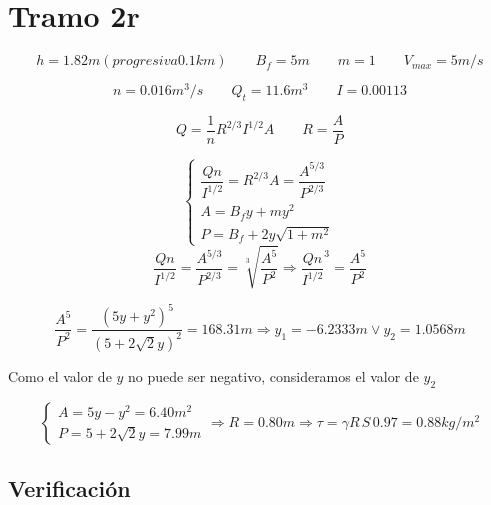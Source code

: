 \section*{Tramo 2r}


\begin{equation*}
  h = 1.82 m (progresiva 0.1 km)
 \qquad
  B_{f} = 5 m
 \qquad
  m = 1
 \qquad
  V_{max} = 5 m/s
\end{equation*}

\begin{equation*}
  n = 0.016 m^3/s
 \qquad
  Q_{t} = 11.6 m^{3}
 \qquad
  I = 0.00113
\end{equation*}

\begin{equation*}
 Q = \frac{1}{n} R^{2/3} I^{1/2} A
 \qquad
 R = \frac{A}{P}
\end{equation*}

\begin{equation*}
  \begin{cases}
    \dfrac{Q n}{I^{1/2}} = R^{2/3} A = \dfrac{A^{5/3}}{P^{2/3}} \\
    A = B_{f}y + m y^{2} \\
    P = B_{f} + 2 y \sqrt{1 + m^{2}}
  \end{cases}
\end{equation*}
\begin{equation*}
  \dfrac{Q n}{I^{1/2}} = \dfrac{A^{5/3}}{P^{2/3}} = \sqrt[3]{\dfrac{A^{5}}{P^{2}}}
  \Longrightarrow
  \dfrac{Q n}{I^{1/2}}^{3} = \dfrac{A^{5}}{P^{2}}
\end{equation*}

\begin{equation*}
  \dfrac{A^{5}}{P^{2}} = \dfrac{(5 y + y^{2})^{5}}{(5 + 2 \sqrt{2} y)^{2}} = 168.31 m
  \Longrightarrow
  y_{1} = -6.2333 m \vee y_{2} = 1.0568 m
\end{equation*}


Como el valor de $y$ no puede ser negativo, consideramos el valor de $y_{2}$

\begin{equation*}
  \begin{cases}
    A = 5 y - y^{2} = 6.40 m^{2} \\
    P = 5 + 2 \sqrt{2} y = 7.99 m
  \end{cases}
  \Longrightarrow
  R = 0.80 m
  \Longrightarrow
  \tau = \gamma R \, S \, 0.97 = 0.88 kg/m^{2}
\end{equation*}


\subsection*{Verificación}

